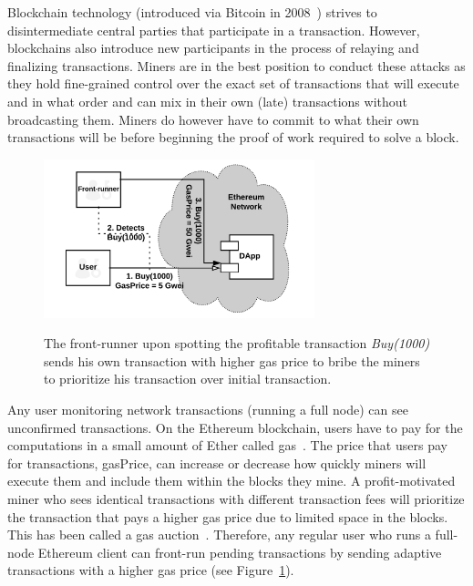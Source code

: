Blockchain technology (introduced via Bitcoin in 2008~\cite{nakamoto2008bitcoin}) strives to disintermediate central parties that participate in a transaction. However, blockchains also introduce new participants in the process of relaying and finalizing transactions. Miners are in the best position to conduct these attacks as they hold fine-grained control over the exact set of transactions that will execute and in what order and can mix in their own (late) transactions without broadcasting them. Miners do however have to commit to what their own transactions will be before beginning the proof of work required to solve a block.

\begin{figure}[h]
    \centering
    {\caption[Simple Front-running flow on a blockchain]{The front-runner upon spotting the profitable transaction \textit{Buy(1000)} sends his own transaction with higher gas price to bribe the miners to prioritize his transaction over initial transaction.}\label{fig:RegularFrontrunning}}
    {\includegraphics[width=0.7\textwidth]{figures/Regular_frontrunning.png}}
    \end{figure}

    
Any user monitoring network transactions (\eg running a full node) can see unconfirmed transactions. On the Ethereum blockchain, users have to pay for the computations in a small amount of Ether called \textsf{gas}~\cite{AccountT67:online}. The price that users pay for transactions, \textsf{gasPrice}, can increase or decrease how quickly miners will execute them and include them within the blocks they mine. A profit-motivated miner who sees identical transactions with different transaction fees will prioritize the transaction that pays a higher gas price due to limited space in the blocks. This has been called a gas auction~\cite{frontrunme}. Therefore, any regular user who runs a full-node Ethereum client can front-run pending transactions by sending adaptive transactions with a higher gas price (see Figure~\ref{fig:RegularFrontrunning}).

